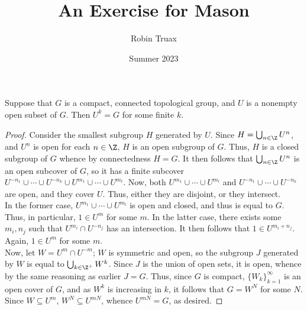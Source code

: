 \documentclass[12pt]{article}
\title{An Exercise for Mason}
\author{Robin Truax}
\date{Summer 2023}
\begin{document}
\maketitle

\begin{proposition}[Exercise 1]\label{prop:Exercise_1}
    Suppose that $G$ is a compact, connected topological group, and $U$ is a nonempty open subset of $G$.
    Then $U^k = G$ for some finite $k$.
\end{proposition}
\begin{proof}
    Consider the smallest subgroup $H$ generated by $U$.
    Since $H = \bigcup_{n \in \Z}U^n$, and $U^n$ is open for each $n \in \Z$, $H$ is an open subgroup of $G$.
    Thus, $H$ is a closed subgroup of $G$ whence by connectedness $H = G$.
    It then follows that $\bigcup_{n \in \Z}U^n$ is an open subcover of $G$, so it has a finite subcover $U^{-n_1} \cup \cdots \cup U^{-n_k} \cup U^{m_1} \cup \cdots \cup U^{m_l}$.
    Now, both $U^{m_1} \cup \cdots \cup U^{m_l}$ and $U^{-n_1} \cup \cdots \cup U^{-n_k}$ are open, and they cover $U$.
    Thus, either they are disjoint, or they intersect.
    \\

    In the former case, $U^{m_1} \cup \cdots \cup U^{m_l}$ is open and closed, and thus is equal to $G$.
    Thus, in particular, $1 \in U^m$ for some $m$.
    In the latter case, there exists some $m_i,n_j$ such that $U^{m_i} \cap U^{-n_j}$ has an intersection.
    It then follows that $1 \in U^{m_i + n_j}$.
    Again, $1 \in U^m$ for some $m$.
    \\

    Now, let $W = U^m \cap U^{-m}$; $W$ is symmetric and open, so the subgroup $J$ generated by $W$ is equal to $\bigcup_{k \in \Z^+} W^k$.
    Since $J$ is the union of open sets, it is open, whence by the same reasoning as earlier $J = G$.
    Thus, since $G$ is compact, $\{W_k\}_{k=1}^{\infty}$ is an open cover of $G$, and as $W^k$ is increasing in $k$, it follows that $G = W^N$ for some $N$.
    Since $W \subseteq U^m$, $W^N \subseteq U^{mN}$, whence $U^{mN} = G$, as desired.
\end{proof}
\end{document}
